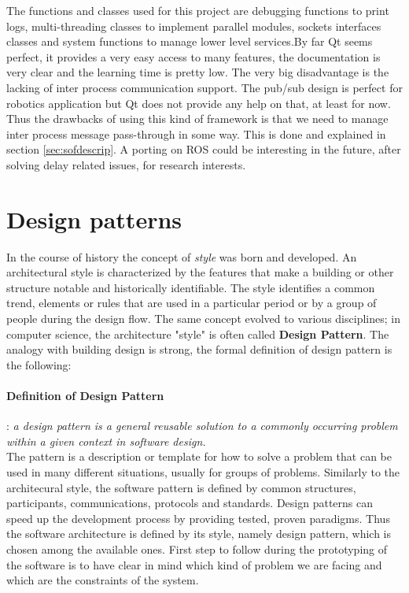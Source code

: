 The functions and classes used for this project are debugging functions to print logs, multi-threading classes to implement parallel modules, sockets interfaces classes and system functions to manage lower level services.By far Qt seems perfect, it provides a very easy access to many features, the documentation is very clear and the learning time is pretty low. The very big disadvantage is the lacking of inter process communication support. The pub/sub design is perfect for robotics application but Qt does not provide any help on that, at least for now. Thus the drawbacks of using this kind of framework is that we need to manage inter process message pass-through in some way. This is done and explained in section \ref{sec:sofdescrip}. A porting on ROS could be interesting in the future, after solving delay related issues, for research interests.
\section{Design patterns}
\label{sec:patterns}
In the course of history the concept of \textit{style} was born and developed. An architectural style is characterized by the features that make a building or other structure notable and historically identifiable. The style identifies a common trend, elements or rules that are used in a particular period or by a group of people during the design flow. The same concept evolved to various disciplines; in computer science, the architecture "style" is often called \textbf{Design Pattern}. The analogy with building design is strong, the formal definition of design pattern is the following: 
\paragraph{Definition of Design Pattern}:  \textit{a design pattern is a general reusable solution to a commonly occurring problem within a given context in software design.} \\

\noindent
The pattern is a description or template for how to solve a problem that can be used in many different situations, usually for groups of problems. Similarly to the architecural style, the software pattern is defined by common structures, participants, communications, protocols and standards. Design patterns can speed up the development process by providing tested, proven paradigms. Thus the software architecture is defined by its style, namely design pattern, which is chosen among the available ones. First step to follow during the prototyping of the software is to have clear in mind which kind of problem we are facing and which are the constraints of the system. 

